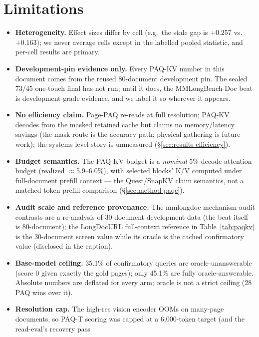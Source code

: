 \documentclass[11pt,letterpaper]{article}
\newcommand{\paq}{\textsc{PAQ}}
\newcommand{\paqt}{\textsc{PAQ-T}}
\newcommand{\paqc}{\textsc{PAQ-KV}}
\begin{document}
\section{Limitations}\label{sec:limitations}
\begin{itemize}
  \item \textbf{Heterogeneity.} Effect sizes differ by cell (e.g.\ the stale gap is $+0.257$ vs.\
        $+0.163$); we never average cells except in the labelled pooled statistic, and per-cell
        results are primary.
  \item \textbf{Development-pin evidence only.} Every \paqc{} number in this document comes
        from the reused 80-document development pin. The sealed 73/45 one-touch final has not
        run; until it does, the MMLongBench-Doc beat is development-grade evidence, and we
        label it so wherever it appears.
  \item \textbf{No efficiency claim.} Page-\paq{} re-reads at full resolution; \paqc{} decodes
        from the masked retained cache but claims no memory/latency savings (the mask route is
        the accuracy path; physical gathering is future work); the systems-level story is
        unmeasured (\S\ref{sec:results-efficiency}).
  \item \textbf{Budget semantics.} The \paqc{} budget is a \emph{nominal} 5\% decode-attention
        budget (realized $\approx$5.9--6.0\%), with selected blocks' K/V computed under
        full-document prefill context --- the Quest/SnapKV claim semantics, not a
        matched-token prefill comparison (\S\ref{sec:method-paqc}).
  \item \textbf{Audit scale and reference provenance.} The mmlongdoc mechanism-audit contrasts
        are a re-analysis of 30-document development data (the beat itself is 80-document);
        the LongDocURL full-context reference in Table~\ref{tab:paqkv} is the 30-document
        screen value while its oracle is the cached confirmatory value (disclosed in the
        caption).
  \item \textbf{Base-model ceiling.} 35.1\% of confirmatory queries are oracle-unanswerable
        (score 0 given exactly the gold pages); only 45.1\% are fully oracle-answerable. Absolute
        numbers are deflated for every arm; oracle is not a strict ceiling (28 \paq{} wins over it).
  \item \textbf{Resolution cap.} The high-res vision encoder OOMs on many-page documents, so
        \paqt{} scoring was capped at a 6{,}000-token target (and the read-eval's recovery pass

\end{itemize}
\end{document}
